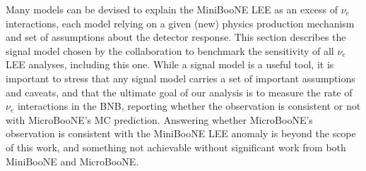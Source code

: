 \par  Many models can be devised to explain the MiniBooNE LEE as an excess of $\nu_e$ interactions, each model relying on a given (new) physics production mechanism and set of assumptions about the detector response. This section describes the signal model chosen by the collaboration to benchmark the sensitivity of all $\nu_e$ LEE analyses, including this one.  While a signal model is a useful tool, it is important to stress that any signal model carries a set of important assumptions and caveats, and that the ultimate goal of our analysis is to measure the rate of $\nu_e$ interactions in the BNB, reporting whether the observation is consistent or not with MicroBooNE's MC prediction. Answering whether MicroBooNE's observation is consistent with the MiniBooNE LEE anomaly is beyond the scope of this work, and something not achievable without significant work from both MiniBooNE and MicroBooNE.

